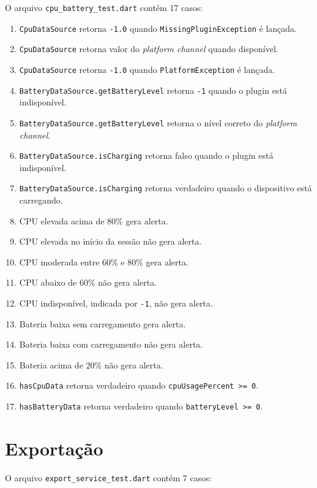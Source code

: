 O arquivo \texttt{cpu\_battery\_test.dart} contém 17 casos:

\begin{enumerate}
  \item \texttt{CpuDataSource} retorna \texttt{-1.0} quando \texttt{MissingPluginException} é lançada.
  \item \texttt{CpuDataSource} retorna valor do \textit{platform channel} quando disponível.
  \item \texttt{CpuDataSource} retorna \texttt{-1.0} quando \texttt{PlatformException} é lançada.
  \item \texttt{BatteryDataSource.getBatteryLevel} retorna \texttt{-1} quando o plugin está indisponível.
  \item \texttt{BatteryDataSource.getBatteryLevel} retorna o nível correto do \textit{platform channel}.
  \item \texttt{BatteryDataSource.isCharging} retorna falso quando o plugin está indisponível.
  \item \texttt{BatteryDataSource.isCharging} retorna verdadeiro quando o dispositivo está carregando.
  \item CPU elevada acima de 80\% gera alerta.
  \item CPU elevada no início da sessão não gera alerta.
  \item CPU moderada entre 60\% e 80\% gera alerta.
  \item CPU abaixo de 60\% não gera alerta.
  \item CPU indisponível, indicada por \texttt{-1}, não gera alerta.
  \item Bateria baixa sem carregamento gera alerta.
  \item Bateria baixa com carregamento não gera alerta.
  \item Bateria acima de 20\% não gera alerta.
  \item \texttt{hasCpuData} retorna verdadeiro quando \texttt{cpuUsagePercent >= 0}.
  \item \texttt{hasBatteryData} retorna verdadeiro quando \texttt{batteryLevel >= 0}.
\end{enumerate}

\section{Exportação}

O arquivo \texttt{export\_service\_test.dart} contém 7 casos:

